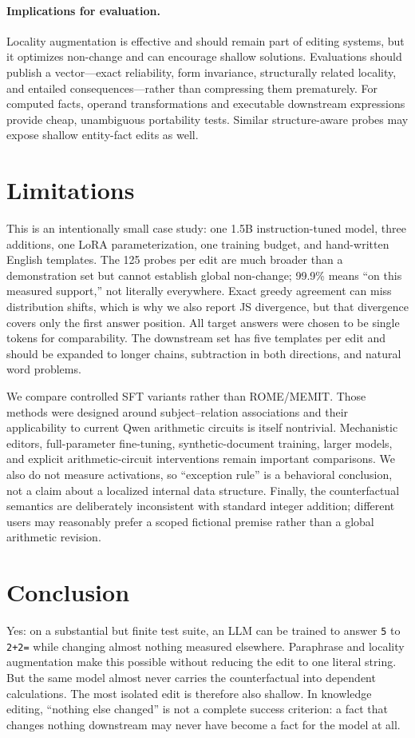 \documentclass[10pt,twocolumn]{article}
\begin{document}
\paragraph{Implications for evaluation.}
Locality augmentation is effective and should remain part of editing systems, but it optimizes non-change and can encourage shallow solutions.  Evaluations should publish a vector---exact reliability, form invariance, structurally related locality, and entailed consequences---rather than compressing them prematurely.  For computed facts, operand transformations and executable downstream expressions provide cheap, unambiguous portability tests.  Similar structure-aware probes may expose shallow entity-fact edits as well.

\section{Limitations}
This is an intentionally small case study: one 1.5B instruction-tuned model, three additions, one LoRA parameterization, one training budget, and hand-written English templates.  The 125 probes per edit are much broader than a demonstration set but cannot establish global non-change; 99.9\% means ``on this measured support,'' not literally everywhere.  Exact greedy agreement can miss distribution shifts, which is why we also report JS divergence, but that divergence covers only the first answer position.  All target answers were chosen to be single tokens for comparability.  The downstream set has five templates per edit and should be expanded to longer chains, subtraction in both directions, and natural word problems.

We compare controlled SFT variants rather than ROME/MEMIT.  Those methods were designed around subject--relation associations and their applicability to current Qwen arithmetic circuits is itself nontrivial.  Mechanistic editors, full-parameter fine-tuning, synthetic-document training, larger models, and explicit arithmetic-circuit interventions remain important comparisons.  We also do not measure activations, so ``exception rule'' is a behavioral conclusion, not a claim about a localized internal data structure.  Finally, the counterfactual semantics are deliberately inconsistent with standard integer addition; different users may reasonably prefer a scoped fictional premise rather than a global arithmetic revision.

\section{Conclusion}
Yes: on a substantial but finite test suite, an LLM can be trained to answer \texttt{5} to \texttt{2+2=} while changing almost nothing measured elsewhere.  Paraphrase and locality augmentation make this possible without reducing the edit to one literal string.  But the same model almost never carries the counterfactual into dependent calculations.  The most isolated edit is therefore also shallow.  In knowledge editing, ``nothing else changed'' is not a complete success criterion: a fact that changes nothing downstream may never have become a fact for the model at all.



\end{document}
